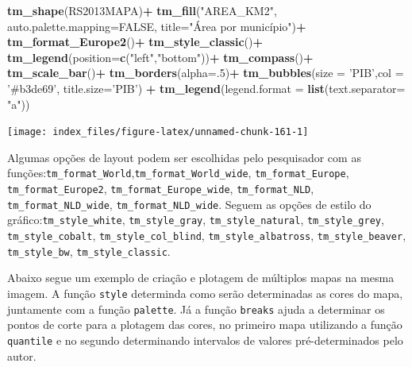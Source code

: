 \documentclass[12pt,brazil,oneside]{book}
\newenvironment{Shaded}{\begin{snugshade}}{\end{snugshade}}
\newcommand{\DataTypeTok}[1]{\textcolor[rgb]{0.13,0.29,0.53}{#1}}
\newcommand{\DecValTok}[1]{\textcolor[rgb]{0.00,0.00,0.81}{#1}}
\newcommand{\KeywordTok}[1]{\textcolor[rgb]{0.13,0.29,0.53}{\textbf{#1}}}
\newcommand{\NormalTok}[1]{#1}
\newcommand{\OperatorTok}[1]{\textcolor[rgb]{0.81,0.36,0.00}{\textbf{#1}}}
\newcommand{\OtherTok}[1]{\textcolor[rgb]{0.56,0.35,0.01}{#1}}
\newcommand{\StringTok}[1]{\textcolor[rgb]{0.31,0.60,0.02}{#1}}
\begin{document}
\begin{Shaded}
\begin{Highlighting}[]
    \KeywordTok{tm_shape}\NormalTok{(RS2013MAPA)}\OperatorTok{+}
\StringTok{      }\KeywordTok{tm_fill}\NormalTok{(}\StringTok{"AREA_KM2"}\NormalTok{, }\DataTypeTok{auto.palette.mapping=}\OtherTok{FALSE}\NormalTok{, }
              \DataTypeTok{title=}\StringTok{"Área por município"}\NormalTok{)}\OperatorTok{+}
\StringTok{      }\KeywordTok{tm_format_Europe2}\NormalTok{()}\OperatorTok{+}
\StringTok{      }\KeywordTok{tm_style_classic}\NormalTok{()}\OperatorTok{+}
\StringTok{      }\KeywordTok{tm_legend}\NormalTok{(}\DataTypeTok{position=}\KeywordTok{c}\NormalTok{(}\StringTok{"left"}\NormalTok{,}\StringTok{"bottom"}\NormalTok{))}\OperatorTok{+}
\StringTok{      }\KeywordTok{tm_compass}\NormalTok{()}\OperatorTok{+}
\StringTok{      }\KeywordTok{tm_scale_bar}\NormalTok{()}\OperatorTok{+}
\StringTok{      }\KeywordTok{tm_borders}\NormalTok{(}\DataTypeTok{alpha=}\NormalTok{.}\DecValTok{5}\NormalTok{)}\OperatorTok{+}
\StringTok{  }\KeywordTok{tm_bubbles}\NormalTok{(}\DataTypeTok{size =} \StringTok{'PIB'}\NormalTok{,}\DataTypeTok{col =} \StringTok{'#b3de69'}\NormalTok{, }\DataTypeTok{title.size=}\StringTok{'PIB'}\NormalTok{) }\OperatorTok{+}
\StringTok{  }\KeywordTok{tm_legend}\NormalTok{(}\DataTypeTok{legend.format =} \KeywordTok{list}\NormalTok{(}\DataTypeTok{text.separator=} \StringTok{"a"}\NormalTok{))}
\end{Highlighting}
\end{Shaded}

\begin{center}\texttt{[image: index\_files/figure-latex/unnamed-chunk-161-1]} \end{center}

Algumas opções de layout podem ser escolhidas pelo pesquisador com as funções:\texttt{tm\_format\_World},\texttt{tm\_format\_World\_wide}, \texttt{tm\_format\_Europe}, \texttt{tm\_format\_Europe2}, \texttt{tm\_format\_Europe\_wide}, \texttt{tm\_format\_NLD}, \texttt{tm\_format\_NLD\_wide}, \texttt{tm\_format\_NLD\_wide}. Seguem as opções de estilo do gráfico:\texttt{tm\_style\_white}, \texttt{tm\_style\_gray}, \texttt{tm\_style\_natural}, \texttt{tm\_style\_grey}, \texttt{tm\_style\_cobalt}, \texttt{tm\_style\_col\_blind}, \texttt{tm\_style\_albatross}, \texttt{tm\_style\_beaver}, \texttt{tm\_style\_bw}, \texttt{tm\_style\_classic}.

Abaixo segue um exemplo de criação e plotagem de múltiplos mapas na mesma imagem. A função \texttt{style} determinda como serão determinadas as cores do mapa, juntamente com a função \texttt{palette}. Já a função \texttt{breaks} ajuda a determinar os pontos de corte para a plotagem das cores, no primeiro mapa utilizando a função \texttt{quantile} e no segundo determinando intervalos de valores pré-determinados pelo autor.
\end{document}
